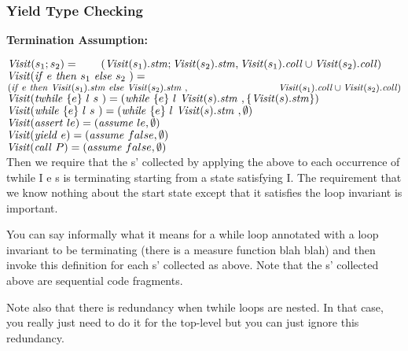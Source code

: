 \subsubsection{Yield Type Checking}

{\bf Termination Assumption:}

\noindent
${\mathit{Visit}}(s_1; s_2) = \\ \hspace*{0.7cm} ({\mathit{Visit}}(s_1).\mathit{stm}; {\mathit{Visit}}(s_2).\mathit{stm}, {\mathit{Visit}}(s_1).\mathit{coll} \cup {\mathit{Visit}}(s_2).\mathit{coll})$\\
${\mathit{Visit}}({\mathit{if}\ {e}\ }{\mathit{then}\ {s_1}\ }{\mathit{else}\ { s_2}\ }) = $  \\
\hspace*{1.3cm}$( \ite{e}{\Visit(s_1).\stm}{\Visit(s_2).\stm}, \\
\hspace*{3.3cm}\Visit(s_1).\coll \cup \Visit(s_2).\coll)$\\
${\mathit{Visit}}(\mathit{twhile}\ \{{e}\}\ {{l}\ } {{s}\ }) = ( \mathit{while}\ \{{e}\}\ {{l}\ } {{{\mathit{Visit}}(s).\mathit{stm}}\ }, \{{\mathit{Visit}}(s).\mathit{stm}\} )$\\
${\mathit{Visit}}(\mathit{while}\ \{{e}\}\ {{l}\ } {{s}\ }) = ( \mathit{while}\ \{{e}\}\ {{l}\ } {{{\mathit{Visit}}(s).\mathit{stm}}\ }, \emptyset)$\\
${\mathit{Visit}}(\mathit{assert}\ le) = (\mathit{assume}\ le, \emptyset)$\\
${\mathit{Visit}}(\mathit{yield}\ e) = (\mathit{assume}\ false, \emptyset)$\\
${\mathit{Visit}}(\mathit{call}\ P) = (\mathit{assume}\ false, \emptyset)$\\


Then we require that the s' collected by applying the above to each occurrence of twhile {I} e s is terminating starting from a state satisfying I.  The requirement that we know nothing about the start state except that it satisfies the loop invariant is important.

You can say informally what it means for a while loop annotated with a loop invariant to be terminating (there is a measure function blah blah) and then invoke this definition for each s' collected as above.  Note that the s' collected above are sequential code fragments.  

Note also that there is redundancy when twhile loops are nested.  In that case, you really just need to do it for the top-level but you can just ignore this redundancy.



